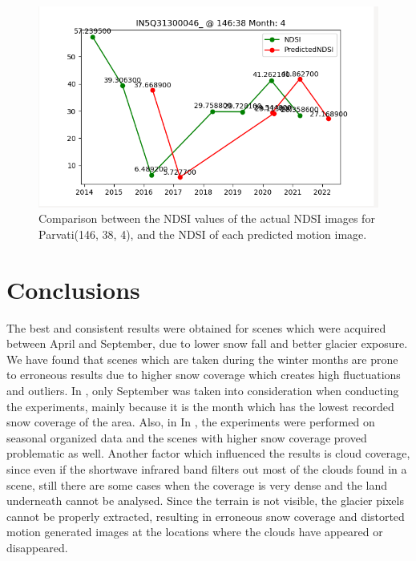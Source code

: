 \documentclass[12pt, a4paper]{report}
\begin{document}
	\begin{figure}[h!]
		\centering
		\includegraphics[scale=0.5]{../images/experiment_146385.png}
		\caption{Comparison between the NDSI values of the actual NDSI images for Parvati(146, 38, 4), and the NDSI of each predicted motion image.}
		\label{fig:parvati_146384}
	\end{figure}
	
	\newpage{}	
	\chapter{Conclusions}
	\label{seq:conclusions}
	
	\par The best and consistent results were obtained for scenes which were acquired between April and September, due to lower snow fall and better glacier exposure. We have found that scenes which are taken during the winter months are prone to erroneous results due to higher snow coverage which creates high fluctuations and outliers. In \cite{TAK2020}, only September was taken into consideration when conducting the experiments, mainly because it is the month which has the lowest recorded snow coverage of the area. Also, in In \cite{RACOVITEANU2019}, the experiments were performed on seasonal organized data and the scenes with higher snow coverage proved problematic as well. Another factor which influenced the results is cloud coverage, since even if the shortwave infrared band filters out most of the clouds found in a scene, still there are some cases when the coverage is very dense and the land underneath cannot be analysed. Since the terrain is not visible, the glacier pixels cannot be properly extracted, resulting in erroneous snow coverage and distorted motion generated images at the locations where the clouds have appeared or disappeared. 
	
\end{document}
